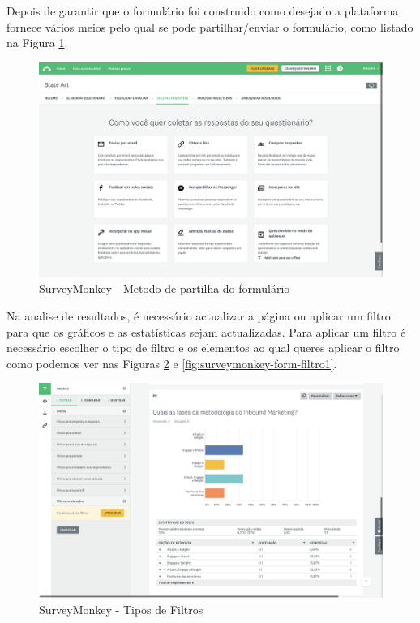 Depois de garantir que o formulário foi construido como desejado a plataforma fornece vários meios pelo qual se pode partilhar/enviar o formulário, como listado na Figura \ref{fig:surveymonkey-form-share}.

\newpage

\begin{figure}[ht!]
	\begin{center}
		\includegraphics[width=1\textwidth]{img/sm/surveymonkey-form-share}
		\caption{SurveyMonkey - Metodo de partilha do formulário }
		\label{fig:surveymonkey-form-share}
	\end{center}
\end{figure}

Na analise de resultados, é necessário actualizar a página ou aplicar um filtro para que os gráficos e as estatísticas sejam actualizadas. Para aplicar um filtro é necessário escolher o tipo de filtro e os elementos ao qual queres aplicar o filtro como podemos ver nas Figuras \ref{fig:surveymonkey-form-filtro} e \ref{fig:surveymonkey-form-filtro1}. 


\begin{figure}[ht!]
	\begin{center}
		\includegraphics[width=1\textwidth]{img/sm/surveymonkey-form-filtro}
		\caption{SurveyMonkey - Tipos de Filtros }
		\label{fig:surveymonkey-form-filtro}
	\end{center}
\end{figure}

